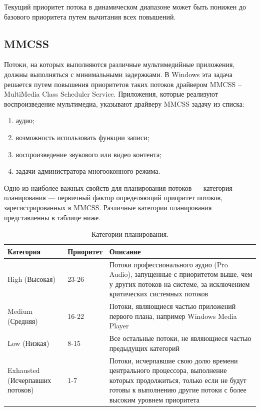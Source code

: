 Текущий приоритет потока в динамическом диапазоне может быть понижен до базового приоритета путем вычитания всех повышений.

\subsection*{MMCSS}

Потоки, на которых выполняются различные мультимедийные приложения, должны выполняться с минимальными задержками. В Windows эта задача решается путем повышения приоритетов таких потоков драйвером MMCSS -- MultiMedia Class Scheduler Service. Приложения, которые реализуют воспроизведение мультимедиа, указывают драйверу MMCSS задачу из списка:

\begin{enumerate}[]
	\item аудио;
	\item возможность использовать функции записи;
	\item воспроизведение звукового или видео контента;
	\item задачи администратора многооконного режима.
\end{enumerate}

Одно из наиболее важных свойств для планирования потоков --- категория планирования --- первичный фактор определяющий приоритет потоков, зарегистрированных в MMCSS. Различные категории планирования представленны в таблице ниже.

\begin{table}[h!]
	\caption{Категории планирования.}
	\begin{center}
		\begin{tabular}{|p{40mm}|p{30mm}|p{80mm}|}
			\hline
			\textbf{Категория} & \textbf{Приоритет} & \textbf{Описание} \\
			\hline
			High (Высокая) & 23-26 & Потоки профессионального аудио (Pro Audio), запущенные с приоритетом выше, чем у других потоков на системе, за исключением критических системных потоков \\
			\hline
			Medium (Средняя) & 16-22 & Потоки, являющиеся частью приложений первого плана, например Windows Media Player \\
			\hline
			Low (Низкая) & 8-15 & Все остальные потоки, не являющиеся частью предыдущих категорий \\
			\hline
			Exhausted (Исчерпавших потоков) & 1-7 & Потоки, исчерпавшие свою долю времени центрального процессора, выполнение которых продолжиться, только если не будут готовы к выполнению другие потоки с более высоким уровнем приоритета \\
			\hline
		\end{tabular}
	\end{center}
	\label{tab:plan}
\end{table}

